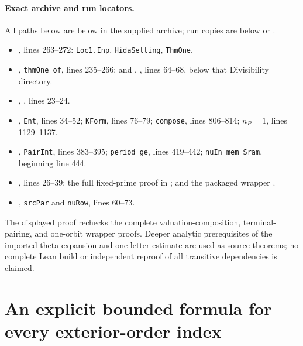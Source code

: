 \documentclass[11pt,a4paper]{article}
\theoremstyle{definition}
\theoremstyle{remark}
\begin{document}
\paragraph{Exact archive and run locators.}
All paths below are below  in the supplied archive;
run copies are below  or
.
\begin{itemize}
\item {}
, lines 263--272:
\texttt{Loc1.Inp}, \texttt{HidaSetting}, \texttt{ThmOne}.
\item {},
\texttt{thmOne\_of}, lines 235--266; and
,
, lines 64--68, below that
Divisibility directory.
\item {},
, lines 23--24.
\item {},
\texttt{Ent}, lines 34--52; \texttt{KForm}, lines 76--79;
\texttt{compose}, lines 806--814; $n_P=1$, lines 1129--1137.
\item {}
, \texttt{PairInt}, lines 383--395;
\texttt{period\_ge}, lines 419--442;
\texttt{nuIn\_mem\_Sram}, beginning line 444.
\item {}
, lines 26--39;
the full fixed-prime proof in
;
and the packaged wrapper .
\item {},
\texttt{srcPar} and \texttt{nuRow}, lines 60--73.
\end{itemize}
The displayed proof rechecks the complete valuation-composition,
terminal-pairing, and one-orbit wrapper proofs.  Deeper analytic
prerequisites of the imported theta expansion and one-letter estimate
are used as source theorems; no complete Lean build or independent
reproof of all transitive dependencies is claimed.


\section{An explicit bounded formula for every exterior-order index}
\label{sec:bounded-indices}
\end{document}
